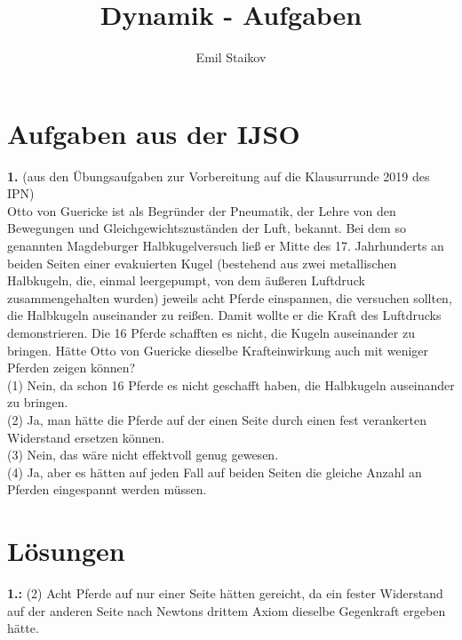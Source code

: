 \documentclass[11pt]{article}
\title{Dynamik - Aufgaben}
\author{Emil Staikov}
\date{}
\begin{document}
\maketitle
\section{Aufgaben aus der IJSO}
\textbf{1.} (aus den Übungsaufgaben zur Vorbereitung auf die Klausurrunde 2019 des IPN) \\
Otto von Guericke ist als Begründer der Pneumatik, der Lehre von den Bewegungen und
Gleichgewichtszuständen der Luft, bekannt. Bei dem so genannten Magdeburger
Halbkugelversuch ließ er Mitte des 17. Jahrhunderts an beiden Seiten einer evakuierten Kugel
(bestehend aus zwei metallischen Halbkugeln, die, einmal leergepumpt, von dem äußeren
Luftdruck zusammengehalten wurden) jeweils acht Pferde einspannen, die versuchen sollten, die
Halbkugeln auseinander zu reißen. Damit wollte er die Kraft des Luftdrucks demonstrieren. Die 16
Pferde schafften es nicht, die Kugeln auseinander zu bringen. Hätte Otto von Guericke dieselbe
Krafteinwirkung auch mit weniger Pferden zeigen können? \\

(1) Nein, da schon 16 Pferde es nicht geschafft haben, die Halbkugeln auseinander zu bringen. \\

(2) Ja, man hätte die Pferde auf der einen Seite durch einen fest verankerten Widerstand ersetzen können. \\

(3) Nein, das wäre nicht effektvoll genug gewesen. \\

(4) Ja, aber es hätten auf jeden Fall auf beiden Seiten die gleiche Anzahl an Pferden eingespannt werden müssen. \\

\pagebreak

\section{Lösungen}
\textbf{1.:} (2) Acht Pferde auf nur einer Seite hätten gereicht, da ein fester Widerstand auf der anderen Seite nach Newtons drittem Axiom dieselbe Gegenkraft ergeben hätte. 
\end{document}
